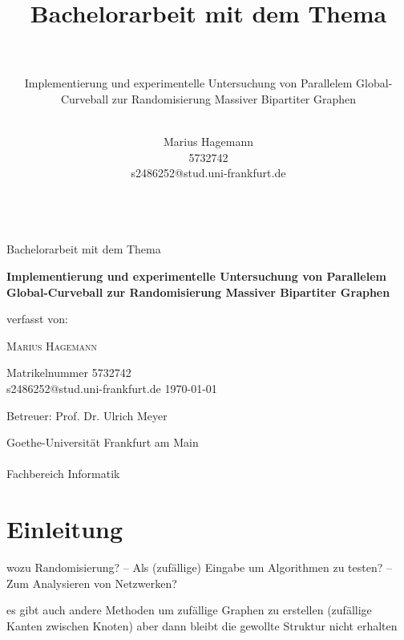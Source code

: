 \documentclass[a4paper]{scrreprt}
\title{Bachelorarbeit mit dem Thema \\ ~}
\subtitle{ Implementierung und experimentelle Untersuchung von Parallelem Global-Curveball zur Randomisierung
Massiver Bipartiter Graphen\\ ~}
\author{Marius Hagemann \\ 5732742 \\ s2486252@stud.uni-frankfurt.de \\~}
\theoremstyle{plain} %
\theoremstyle{definition} %
\begin{document}
\begin{titlepage}
	\centering
	{\LARGE Bachelorarbeit mit dem Thema\par}
	\vfill
	{\huge\bfseries Implementierung und experimentelle Untersuchung von Parallelem Global-Curveball zur Randomisierung
Massiver Bipartiter Graphen\par}
	\vspace{2.5cm}
	{\Large verfasst von: \par}
	\vspace{1cm}
	{\LARGE \scshape Marius Hagemann\par}
	\vspace{0.5cm}
	{\large Matrikelnummer 5732742 \\ s2486252@stud.uni-frankfurt.de}
	\vfill
	{\Large \today}
	\vfill
	{\LARGE Betreuer: Prof. Dr. Ulrich Meyer\par}
	\vspace{1.5cm}
	{\LARGE Goethe-Universität Frankfurt am Main \\ ~\\ Fachbereich Informatik}
\end{titlepage}




\cleardoublepage 



\newpage

\tableofcontents



\chapter{Einleitung}



wozu Randomisierung?
-- Als (zufällige) Eingabe um Algorithmen zu testen?
-- Zum Analysieren von Netzwerken?



es gibt auch andere Methoden um zufällige Graphen zu erstellen (zufällige Kanten zwischen Knoten)
aber dann bleibt die gewollte Struktur nicht erhalten
\end{document}

